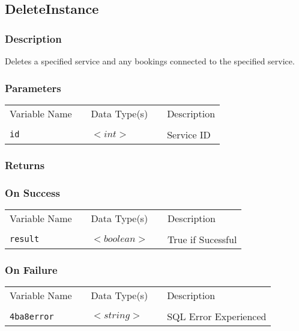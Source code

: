 \subsection{DeleteInstance}

\subsubsection{Description}

Deletes a specified service and any bookings connected to the specified
service.

\subsubsection{Parameters}

\begin{tabular}{lllll}
Variable Name	&		&	Data Type(s)		&	&	Description	\\
				&	&	&	&	\\
\verb!id! & \hspace{15mm} & $<int>$ & \hspace{15mm} & Service ID \\
\end{tabular}

\subsubsection{Returns}

\subsubsection{On Success}

\begin{tabular}{lllll}
Variable Name	&		&	Data Type(s)		&	&	Description	\\
				&	&	&	&	\\
\verb!result! & \hspace{15mm} & $<boolean>$ & \hspace{15mm} & True if Sucessful \\
\end{tabular}

\subsubsection{On Failure}

\begin{tabular}{lllll}
Variable Name	&		&	Data Type(s)		&	&	Description	\\
				&	&	&	&	\\
\verb!4ba8error! & \hspace{15mm} & $<string>$ & \hspace{15mm} & SQL Error Experienced \\
\end{tabular}

